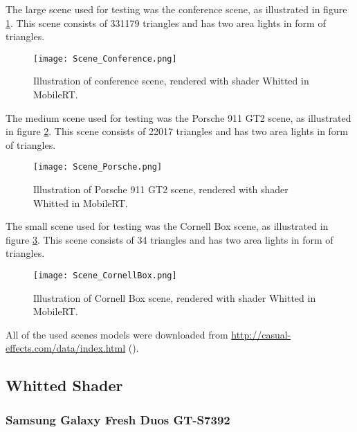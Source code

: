 \par
The large scene used for testing was the conference scene, as illustrated in figure \ref{scene_conference}.
This scene consists of 331179 triangles and has two area lights in form of triangles.

\begin{figure}[H]
	\centering
	\caption{Illustration of conference scene, rendered with shader Whitted in MobileRT.}
	\label{scene_conference}
	\texttt{[image: Scene\_Conference.png]}
\end{figure}

The medium scene used for testing was the Porsche 911 GT2 scene, as illustrated in figure \ref{scene_porsche}.
This scene consists of 22017 triangles and has two area lights in form of triangles.

\begin{figure}[H]
	\centering
	\caption{Illustration of Porsche 911 GT2 scene, rendered with shader Whitted in MobileRT.}
	\label{scene_porsche}
	\texttt{[image: Scene\_Porsche.png]}
\end{figure}

The small scene used for testing was the Cornell Box scene, as illustrated in figure \ref{scene_cornellbox}.
This scene consists of 34 triangles and has two area lights in form of triangles.

\begin{figure}[H]
	\centering
	\caption{Illustration of Cornell Box scene, rendered with shader Whitted in MobileRT.}
	\label{scene_cornellbox}
	\texttt{[image: Scene\_CornellBox.png]}
\end{figure}

\par
All of the used scenes models were downloaded from
\url{http://casual-effects.com/data/index.html}  (\cite{McGuire2017Data}).

\subsection{Whitted Shader}

\subsubsection{Samsung Galaxy Fresh Duos GT-S7392}

